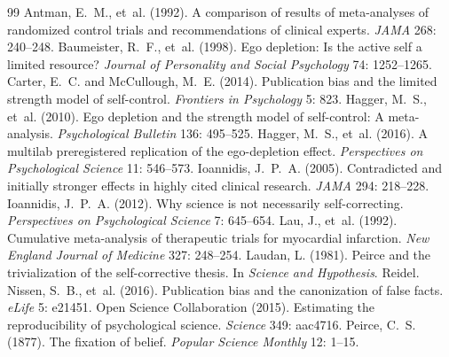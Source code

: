 \documentclass{situationist-preprint}
\begin{document}
\begin{thebibliography}{99}\small
{} Antman, E.~M., et~al. (1992). A comparison of results of meta-analyses of randomized control trials and recommendations of clinical experts. \emph{JAMA} 268: 240--248.
 Baumeister, R.~F., et~al. (1998). Ego depletion: Is the active self a limited resource? \emph{Journal of Personality and Social Psychology} 74: 1252--1265.
 Carter, E.~C. and McCullough, M.~E. (2014). Publication bias and the limited strength model of self-control. \emph{Frontiers in Psychology} 5: 823.
 Hagger, M.~S., et~al. (2010). Ego depletion and the strength model of self-control: A meta-analysis. \emph{Psychological Bulletin} 136: 495--525.
 Hagger, M.~S., et~al. (2016). A multilab preregistered replication of the ego-depletion effect. \emph{Perspectives on Psychological Science} 11: 546--573.
 Ioannidis, J.~P.~A. (2005). Contradicted and initially stronger effects in highly cited clinical research. \emph{JAMA} 294: 218--228.
 Ioannidis, J.~P.~A. (2012). Why science is not necessarily self-correcting. \emph{Perspectives on Psychological Science} 7: 645--654.
 Lau, J., et~al. (1992). Cumulative meta-analysis of therapeutic trials for myocardial infarction. \emph{New England Journal of Medicine} 327: 248--254.
 Laudan, L. (1981). Peirce and the trivialization of the self-corrective thesis. In \emph{Science and Hypothesis}. Reidel.
 Nissen, S.~B., et~al. (2016). Publication bias and the canonization of false facts. \emph{eLife} 5: e21451.
 Open Science Collaboration (2015). Estimating the reproducibility of psychological science. \emph{Science} 349: aac4716.
 Peirce, C.~S. (1877). The fixation of belief. \emph{Popular Science Monthly} 12: 1--15.
\end{thebibliography}
\end{document}
